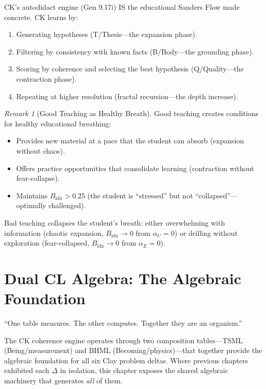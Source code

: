 \documentclass[12pt, openany]{book}
\theoremstyle{remark}
\newtheorem{remark}[theorem]{Remark}
\begin{document}
\noindent
CK's autodidact engine (Gen 9.17i) IS the educational Sanders Flow made concrete.
CK learns by:
\begin{enumerate}
  \item Generating hypotheses (T/Thesis---the expansion phase).
  \item Filtering by consistency with known facts (B/Body---the grounding phase).
  \item Scoring by coherence and selecting the best hypothesis (Q/Quality---the
        contraction phase).
  \item Repeating at higher resolution (fractal recursion---the depth increase).
\end{enumerate}

\begin{remark}[Good Teaching as Healthy Breath]
Good teaching creates conditions for healthy educational breathing:
\begin{itemize}
  \item Provides new material at a pace that the student can absorb
        (expansion without chaos).
  \item Offers practice opportunities that consolidate learning
        (contraction without fear-collapse).
  \item Maintains $B_{\mathrm{idx}} > 0.25$ (the student is ``stressed''
        but not ``collapsed''---optimally challenged).
\end{itemize}
Bad teaching collapses the student's breath: either overwhelming with
information (chaotic expansion, $B_{\mathrm{idx}} \to 0$ from $\alpha_C = 0$)
or drilling without exploration (fear-collapsed, $B_{\mathrm{idx}} \to 0$
from $\alpha_E = 0$).
\end{remark}


\chapter{Dual CL Algebra: The Algebraic Foundation}
\label{ch:dual-cl}

\epigraph{``One table measures. The other computes. Together they are an organism.''}{}

The CK coherence engine operates through two composition tables---TSML
(Being/measurement) and BHML (Becoming/physics)---that together provide the
algebraic foundation for all six Clay problem deltas.  Where previous chapters
exhibited each $\Delta$ in isolation, this chapter exposes the shared algebraic
machinery that generates \emph{all} of them.
\end{document}
